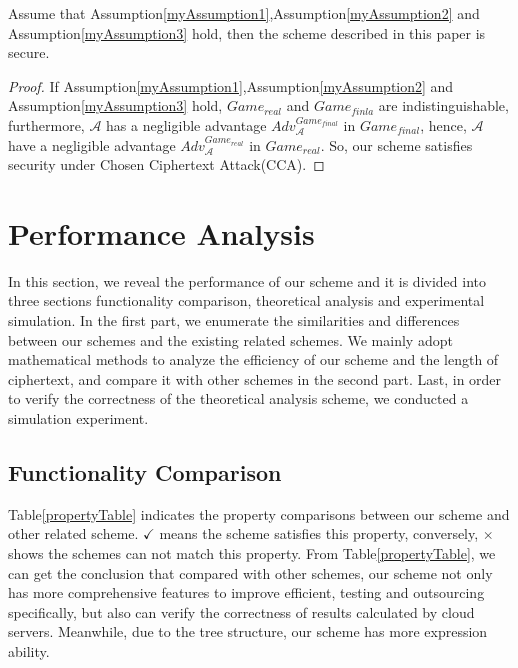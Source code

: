 \documentclass[smallextended]{svjour3}       %
\begin{document}
\begin{myDefinition}
	Assume that Assumption\ref{myAssumption1},Assumption\ref{myAssumption2} and Assumption\ref{myAssumption3} hold, then the scheme described in this paper is secure.
\end{myDefinition}
\begin{proof}
	If Assumption\ref{myAssumption1},Assumption\ref{myAssumption2} and Assumption\ref{myAssumption3} hold, $Game_{real}$ and $Game_{finla}$ are indistinguishable, furthermore, $\mathcal{A}$ has a negligible advantage $Adv_{\mathcal{A}}^{Game_{final}}$ in $Game_{final}$, hence, $\mathcal{A}$ have a negligible advantage $Adv_{\mathcal{A}}^{Game_{real}}$ in $Game_{real}$. So, our scheme satisfies security under Chosen Ciphertext Attack(CCA). 
\end{proof}
\section{Performance Analysis}\label{section5}
In this section, we reveal the performance of our scheme and it is divided into three sections functionality comparison, theoretical analysis and experimental simulation. 
In the first part, we enumerate the similarities and differences between our schemes and the existing related schemes.  
We mainly adopt mathematical methods to analyze the efficiency of our scheme and the length of ciphertext, and compare it with other schemes in the second part. 
Last, in order to verify the correctness of the theoretical analysis scheme, we conducted a simulation experiment. 

\subsection{Functionality Comparison}
Table\ref{propertyTable} indicates the property comparisons between our scheme and other related scheme. 
$\checkmark$ means the scheme satisfies this property, conversely, $\times$ shows the schemes can not match this property. 
From Table\ref{propertyTable}, we can get the conclusion that compared with other schemes, our scheme not only has more comprehensive features to improve efficient, testing and outsourcing specifically, but also can verify the correctness of results calculated by cloud servers.
Meanwhile, due to the tree structure, our scheme has more expression ability.  
\end{document}
